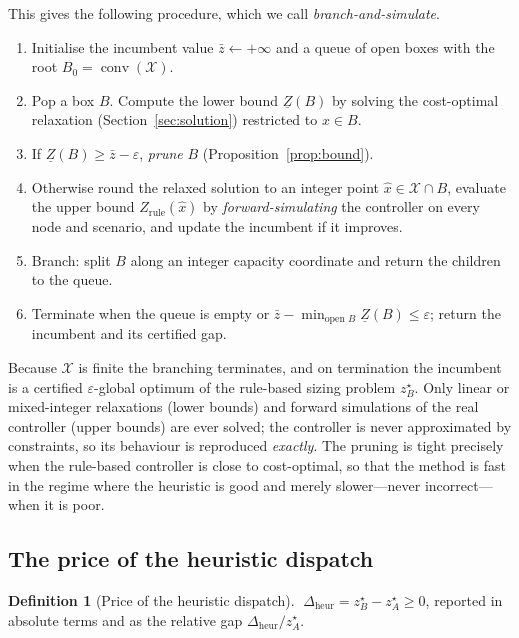 \documentclass[11pt,a4paper]{article}
\theoremstyle{plain}
\theoremstyle{definition}
\newtheorem{definition}{Definition}
\begin{document}
This gives the following procedure, which we call \emph{branch-and-simulate}.
\begin{enumerate}[leftmargin=2em,itemsep=1pt]
  \item Initialise the incumbent value $\bar{z}\leftarrow+\infty$ and a queue of open
  boxes with the root $B_0=\operatorname{conv}(\mathcal{X})$.
  \item Pop a box $B$. Compute the lower bound $\underline{Z}(B)$ by solving the
  cost-optimal relaxation (Section~\ref{sec:solution}) restricted to $x\in B$.
  \item If $\underline{Z}(B)\ge\bar{z}-\varepsilon$, \emph{prune} $B$
  (Proposition~\ref{prop:bound}).
  \item Otherwise round the relaxed solution to an integer point $\hat{x}\in
  \mathcal{X}\cap B$, evaluate the upper bound $Z_{\mathrm{rule}}(\hat{x})$ by
  \emph{forward-simulating} the controller on every node and scenario, and update the
  incumbent if it improves.
  \item Branch: split $B$ along an integer capacity coordinate and return the children to
  the queue.
  \item Terminate when the queue is empty or
  $\bar{z}-\min_{\text{open }B}\underline{Z}(B)\le\varepsilon$; return the incumbent and
  its certified gap.
\end{enumerate}
Because $\mathcal{X}$ is finite the branching terminates, and on termination the incumbent
is a certified $\varepsilon$-global optimum of the rule-based sizing problem $z_B^\star$.
Only linear or mixed-integer relaxations (lower bounds) and forward simulations of the
real controller (upper bounds) are ever solved; the controller is never approximated by
constraints, so its behaviour is reproduced \emph{exactly}. The pruning is tight precisely
when the rule-based controller is close to cost-optimal, so that the method is fast in the
regime where the heuristic is good and merely slower---never incorrect---when it is poor.

\subsection{The price of the heuristic dispatch}

\begin{definition}[Price of the heuristic dispatch]
\label{def:price}
$\;\Delta_{\mathrm{heur}} = z_B^\star - z_A^\star \ge 0$, reported in absolute terms and as
the relative gap $\Delta_{\mathrm{heur}}/z_A^\star$.
\end{definition}
\end{document}
